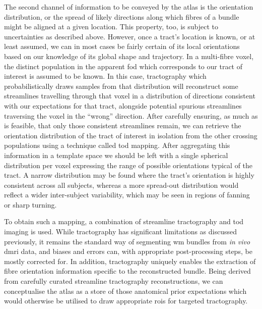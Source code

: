The second channel of information to be conveyed by the atlas is the orientation distribution, or the spread of likely directions along which fibres of a bundle might be aligned at a given location.
This property, too, is subject to uncertainties as described above.
However, once a tract's location is known, or at least assumed, we can in most cases be fairly certain of its local orientations based on our knowledge of its global shape and trajectory.
In a multi-fibre voxel, the distinct population in the apparent \gls{fod} which corresponds to our tract of interest is assumed to be known.
In this case, tractography which probabilistically draws samples from that distribution will reconstruct some streamlines travelling through that voxel in a distribution of directions consistent with our expectations for that tract, alongside potential spurious streamlines traversing the voxel in the ``wrong'' direction.
After carefully ensuring, as much as is feasible, that only those consistent streamlines remain, we can retrieve the orientation distribution of the tract of interest in isolation from the other crossing populations using a technique called \gls{tod}\autocite{Dhollander2014} mapping.
After aggregating this information in a template space we should be left with a single spherical distribution per voxel expressing the range of possible orientations typical of the tract.
A narrow distribution may be found where the tract's orientation is highly consistent across all subjects, whereas a more spread-out distribution would reflect a wider inter-subject variability, which may be seen in regions of fanning or sharp turning.

To obtain such a mapping, a combination of streamline tractography and \gls{tod} imaging is used.
While tractography has significant limitations as discussed previously, it remains the standard way of segmenting \gls{wm} bundles from \textit{in vivo} \gls{dmri} data, and biases and errors can, with appropriate post-processing steps, be mostly corrected for.
In addition, tractography uniquely enables the extraction of fibre orientation information specific to the reconstructed bundle.
Being derived from carefully curated streamline tractography reconstructions, we can conceptualise the atlas as a store of those anatomical prior expectations which would otherwise be utilised to draw appropriate \glspl{roi} for targeted tractography.

